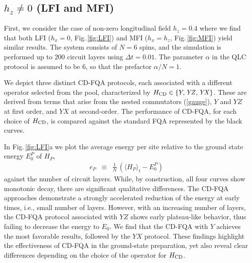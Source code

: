 \documentclass[twocolumn,aps,superscriptaddress,floatfix,longbibliography]{revtex4-2}
\newcommand{\Fig}[1]{Fig.\,\ref{fig:#1}}
\def\YX{\ensuremath{\mathit{YX}}\xspace} %
\def\YZ{\ensuremath{\mathit{YZ}}\xspace}
\begin{document}
\subsection{$h_z\neq 0$ (LFI and MFI)}
First, we consider the case of non-zero
longitudinal field %
$h_z = 0.4$ where we find that both LFI ($h_x=0$, \Fig{LFI})
and MFI ($h_x=h_z$, \Fig{MFI}) yield
similar results.
The system consists of $N=6$ spins, 
and the simulation is performed up to $200$
circuit layers using %
$\Delta t=0.01$. The parameter $\alpha$ in the QLC protocol is assumed to be $6$, so that the prefactor $\alpha/N=1$. 

We depict three distinct CD-FQA protocols, each associated with
a different operator selected from the pool, characterized by
$H_{\rm CD} \in %
\{ Y, \YZ, \YX \}$. These %
are derived from terms that arise from
the nested commutators (\ref{gauge}),
$Y$ and \YZ at %
first order, and %
\YX at %
second-order. %
The performance of CD-FQA, for each choice of $H_{\rm CD}$,
is compared against the standard FQA represented by the black
curves. 

In \Fig{LFI}a we plot
the average energy per site relative to the ground state energy
$E_0^P$ of $H_P$,
\begin{eqnarray}
   e_P &\equiv& 
   \tfrac{1}{N}\, (\langle H_P\rangle_t -E_0^P)
\label{eq:ep}
\end{eqnarray}
against the number of circuit layers. While, by construction,
all four curves show monotonic decay,
there are significant qualitative differences. 
The %
CD-FQA approaches demonstrate a strongly accelerated 
reduction of the energy at early times, i.e.,
small number of layers. However, with
an increasing number of layers, the CD-FQA protocol associated
with \YZ shows early plateau-like behavior, 
thus failing to decrease the energy to $E_0$. 
We find that the CD-FQA with $Y$ achieves the
most favorable results, followed by the \YX protocol.
These findings highlight the effectiveness of CD-FQA in the
ground-state preparation, yet also reveal clear differences
depending on the choice of the
operator for $H_{\rm CD}$.
\end{document}
